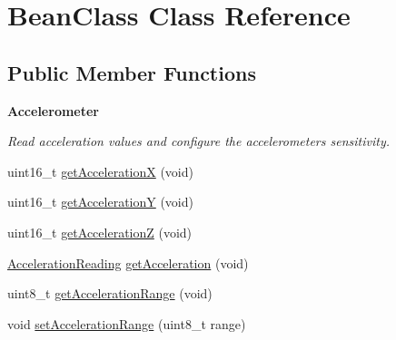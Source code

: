 \hypertarget{class_bean_class}{}\section{Bean\+Class Class Reference}
\label{class_bean_class}
\subsection*{Public Member Functions}
\begin{Indent}{\bf Accelerometer}\par
{\em Read acceleration values and configure the accelerometer\textquotesingle{}s sensitivity. }\begin{DoxyCompactItemize}
\item 
uint16\+\_\+t \hyperlink{class_bean_class_a00e0acb00c41d234b533a7b41ad047cd}{get\+Acceleration\+X} (void)
\item 
uint16\+\_\+t \hyperlink{class_bean_class_a6f10d22cc2d3ed4fcc6a63c19858168f}{get\+Acceleration\+Y} (void)
\item 
uint16\+\_\+t \hyperlink{class_bean_class_a681df15a2b6952547d536f8faebce802}{get\+Acceleration\+Z} (void)
\item 
\hyperlink{struct_a_c_c___r_e_a_d_i_n_g___t}{Acceleration\+Reading} \hyperlink{class_bean_class_a53f2174dd2f3c2907acc3355cef64842}{get\+Acceleration} (void)
\item 
uint8\+\_\+t \hyperlink{class_bean_class_ad08dec6f240de8a53f110ddf066f6ab2}{get\+Acceleration\+Range} (void)
\item 
void \hyperlink{class_bean_class_acb8e9a741e2538393256f95d27c4571d}{set\+Acceleration\+Range} (uint8\+\_\+t range)
\end{DoxyCompactItemize}
\end{Indent}
